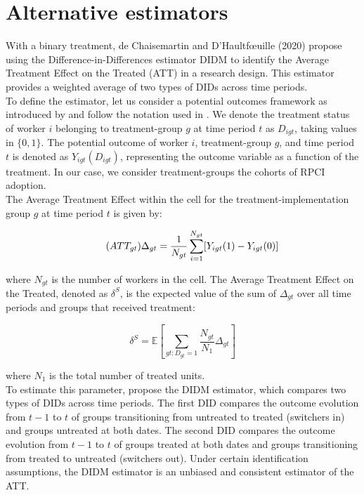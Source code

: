 \documentclass[10pt, oneside]{book}
\begin{document}
\section{Alternative estimators}

With a binary treatment, de Chaisemartin and D'Haultfœuille (2020) propose using the Difference-in-Differences estimator DIDM to identify the Average Treatment Effect on the Treated (ATT) in a research design. This estimator provides a weighted average of two types of DIDs across time periods. \\

To define the estimator, let us consider a potential outcomes framework as introduced by \cite{rubin1974estimating} and follow the notation used in \cite{de2020two}. We denote the treatment status of worker $i$ belonging to treatment-group $g$ at time period $t$ as $D_{igt}$, taking values in $\{0,1\}$. The potential outcome of worker $i$, treatment-group $g$, and time period $t$ is denoted as $Y_{igt}(D_{igt})$, representing the outcome variable as a function of the treatment. In our case, we consider treatment-groups the cohorts of RPCI adoption. \\

The Average Treatment Effect within the cell for the treatment-implementation group $g$ at time period $t$ is given by:

\begin{equation}
    \tag{$ATT_{gt}$}
    \Delta_{gt} = \frac{1}{N_{gt}} \sum_{i=1}^{N_{gt}} [Y_{igt}(1) - Y_{igt}(0)]
\end{equation}

where $N_{gt}$ is the number of workers in the cell. The Average Treatment Effect on the Treated, denoted as $\delta^{S}$, is the expected value of the sum of $\Delta_{gt}$ over all time periods and groups that received treatment:

\begin{equation}
    \tag{$ATT$}
    \delta^{S} = \mathbb{E}\left[\sum_{gt:D_{gt}=1} \frac{N_{gt}}{N_1} \Delta_{gt}\right]
\end{equation}

where $N_1$ is the total number of treated units. \\

To estimate this parameter, \cite{de2020two} propose the DIDM estimator, which compares two types of DIDs across time periods. The first DID compares the outcome evolution from $t-1$ to $t$ of groups transitioning from untreated to treated (switchers in) and groups untreated at both dates. The second DID compares the outcome evolution from $t-1$ to $t$ of groups treated at both dates and groups transitioning from treated to untreated (switchers out). Under certain identification assumptions, the DIDM estimator is an unbiased and consistent estimator of the ATT. \\
\end{document}
